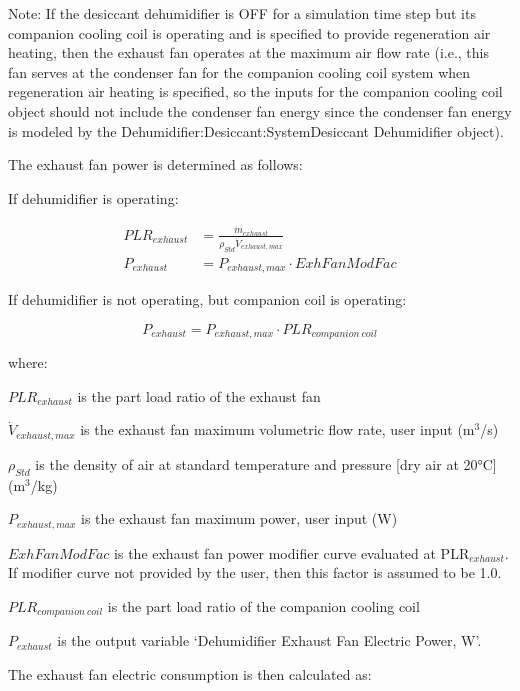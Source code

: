 Note: If the desiccant dehumidifier is OFF for a simulation time step but its companion cooling coil is operating and is specified to provide regeneration air heating, then the exhaust fan operates at the maximum air flow rate (i.e., this fan serves at the condenser fan for the companion cooling coil system when regeneration air heating is specified, so the inputs for the companion cooling coil object should not include the condenser fan energy since the condenser fan energy is modeled by the Dehumidifier:Desiccant:SystemDesiccant Dehumidifier object).

The exhaust fan power is determined as follows:

If dehumidifier is operating:

\begin{equation}
  \begin{array}{rl}
    PLR_{exhaust} &= \frac{\dot{m}_{exhaust}}{\rho_{Std}\dot{V}_{exhaust,max}} \\
    P_{exhaust} &= P_{exhaust,max} \cdot ExhFanModFac
  \end{array}
\end{equation}

If dehumidifier is not operating, but companion coil is operating:

\begin{equation}
  P_{exhaust} = P_{exhaust,max} \cdot PLR_{companion~coil}
\end{equation}

where:

\(PL{R_{exhaust}}\) is the part load ratio of the exhaust fan

\({\dot{V}_{exhaust,max}}\) is the exhaust fan maximum volumetric flow rate, user input (m\(^{3}\)/s)

\({\rho_{Std}}\) is the density of air at standard temperature and pressure {[}dry air at 20°C{]} (m\(^{3}\)/kg)

\({P_{exhaust,max}}\) is the exhaust fan maximum power, user input (W)

\(ExhFanModFac\) is the exhaust fan power modifier curve evaluated at PLR\(_{exhaust}\). If modifier curve not provided by the user, then this factor is assumed to be 1.0.

\(PL{R_{companion~coil}}\) is the part load ratio of the companion cooling coil

\({P_{exhaust}}\) is the output variable `Dehumidifier Exhaust Fan Electric Power, W'.

The exhaust fan electric consumption is then calculated as:

